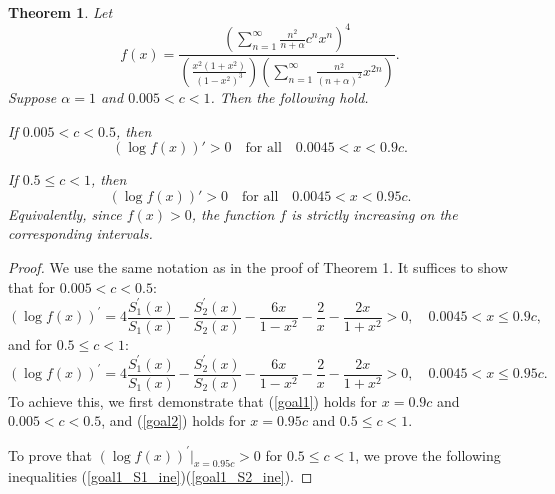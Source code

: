 ﻿\documentclass[10pt]{article}
\newtheorem{theorem}{Theorem}
\begin{document}
\begin{theorem}
Let $$f(x) = \frac{\left(\sum_{n=1}^{\infty}\frac{n^{2}}{n+\alpha}c^{n}x^{n}\right)^{4}}{\left(\frac{x^{2}(1+x^{2})}{(1-x^{2})^{3}}\right)\left(\sum_{n=1}^{\infty}\frac{n^{2}}{(n+\alpha)^{2}}x^{2n}\right)}.$$
Suppose $\alpha=1$ and $0.005<c<1$. Then the following hold.

If $0.005<c<0.5$, then
\[
(\log f(x))'>0
\quad\text{for all}\quad
0.0045<x<0.9c.
\]

If $0.5\leq c<1$, then
\[
(\log f(x))'>0
\quad\text{for all}\quad
0.0045<x<0.95c.
\]
Equivalently, since $f(x)>0$, the function $f$ is strictly increasing on
the corresponding intervals.
\end{theorem}
\begin{proof}
We use the same notation as in the proof of Theorem 1. It suffices to show that for $0.005<c<0.5$:
\begin{equation}
    (\log f(x))^{'} = 4\frac{S_1^{'}(x)}{S_1(x)}-\frac{S_2^{'}(x)}{S_2(x)}-\frac{6x}{1-x^2}-\frac{2}{x}-\frac{2x}{1+x^2}>0,\quad 0.0045<x\leq 0.9c,\label{goal1}
\end{equation}
and for $0.5\leq c<1$:
\begin{equation}
    (\log f(x))^{'} = 4\frac{S_1^{'}(x)}{S_1(x)}-\frac{S_2^{'}(x)}{S_2(x)}-\frac{6x}{1-x^2}-\frac{2}{x}-\frac{2x}{1+x^2}>0,\quad 0.0045<x\leq 0.95c.\label{goal2}
\end{equation}
To achieve this, we first demonstrate that (\ref{goal1}) holds for $x=0.9c$ and $0.005<c<0.5$, and (\ref{goal2}) holds for $x=0.95c$ and $0.5\leq c<1$.

To prove that $(\log f(x))^{\prime}|_{x=0.95c}>0$ for $0.5\le c<1$, we prove the following inequalities (\ref{goal1_S1_ine})(\ref{goal1_S2_ine}).


\end{proof}
\end{document}
